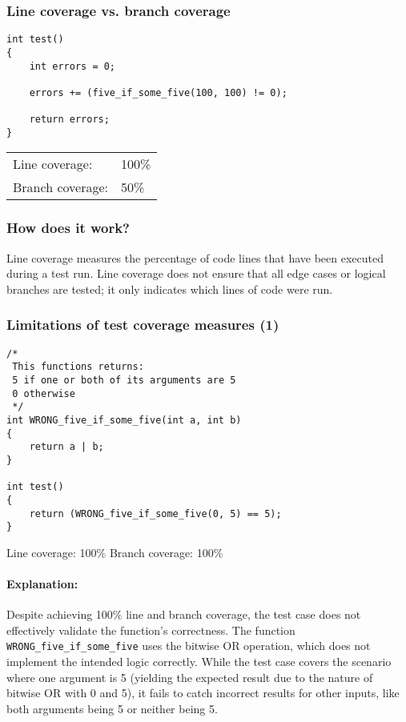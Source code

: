 \documentclass[12pt]{article}
\begin{document}
\subsubsection{Line coverage vs. branch coverage}

\begin{verbatim}
int test()
{
    int errors = 0;

    errors += (five_if_some_five(100, 100) != 0);

    return errors;
}
\end{verbatim}

\begin{tabular}{ l l }
Line coverage: & 100\% \\
Branch coverage: & 50\%
\end{tabular}
\subsubsection{How does it work?}
Line coverage measures the percentage of code lines that have been executed during a test run. Line coverage does not ensure that all edge cases or logical branches are tested; it only indicates which lines of code were run.

\subsubsection{Limitations of test coverage measures (1)}
\begin{verbatim}
/*
 This functions returns:
 5 if one or both of its arguments are 5
 0 otherwise
 */
int WRONG_five_if_some_five(int a, int b)
{
    return a | b;
}

int test()
{
    return (WRONG_five_if_some_five(0, 5) == 5);
}
\end{verbatim}

Line coverage: 100\%
Branch coverage: 100\%
\paragraph{Explanation:}
Despite achieving 100\% line and branch coverage, the test case does not effectively validate the function's correctness. The function \texttt{WRONG\_five\_if\_some\_five} uses the bitwise OR operation, which does not implement the intended logic correctly. While the test case covers the scenario where one argument is 5 (yielding the expected result due to the nature of bitwise OR with 0 and 5), it fails to catch incorrect results for other inputs, like both arguments being 5 or neither being 5.
\end{document}
